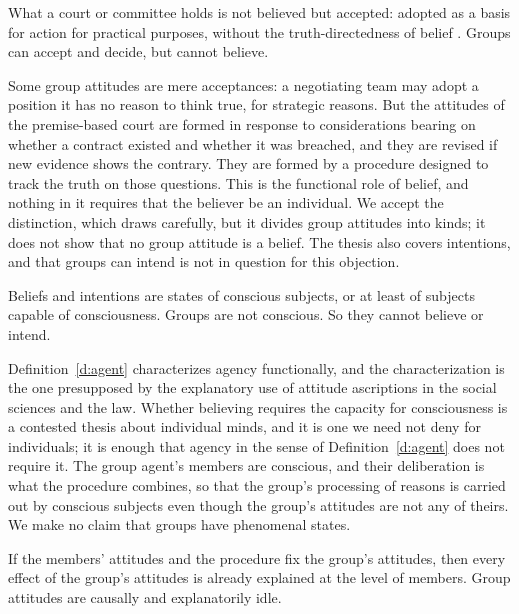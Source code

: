 \documentclass{situationist-preprint}
\begin{document}
\begin{objection}
What a court or committee holds is not believed but accepted: adopted as a basis for action for practical purposes, without the truth-directedness of belief \citep{Wray2001}. Groups can accept and decide, but cannot believe.
\end{objection}

\begin{reply}
Some group attitudes are mere acceptances: a negotiating team may adopt a position it has no reason to think true, for strategic reasons. But the attitudes of the premise-based court are formed in response to considerations bearing on whether a contract existed and whether it was breached, and they are revised if new evidence shows the contrary. They are formed by a procedure designed to track the truth on those questions. This is the functional role of belief, and nothing in it requires that the believer be an individual. We accept the distinction, which \citet{Lackey2021} draws carefully, but it divides group attitudes into kinds; it does not show that no group attitude is a belief. The thesis also covers intentions, and that groups can intend is not in question for this objection.
\end{reply}

\begin{objection}[Consciousness]
Beliefs and intentions are states of conscious subjects, or at least of subjects capable of consciousness. Groups are not conscious. So they cannot believe or intend.
\end{objection}

\begin{reply}
Definition~\ref{d:agent} characterizes agency functionally, and the characterization is the one presupposed by the explanatory use of attitude ascriptions in the social sciences and the law. Whether believing requires the capacity for consciousness is a contested thesis about individual minds, and it is one we need not deny for individuals; it is enough that agency in the sense of Definition~\ref{d:agent} does not require it. The group agent's members are conscious, and their deliberation is what the procedure combines, so that the group's processing of reasons is carried out by conscious subjects even though the group's attitudes are not any of theirs. We make no claim that groups have phenomenal states.
\end{reply}

\begin{objection}
If the members' attitudes and the procedure fix the group's attitudes, then every effect of the group's attitudes is already explained at the level of members. Group attitudes are causally and explanatorily idle.
\end{objection}
\end{document}
